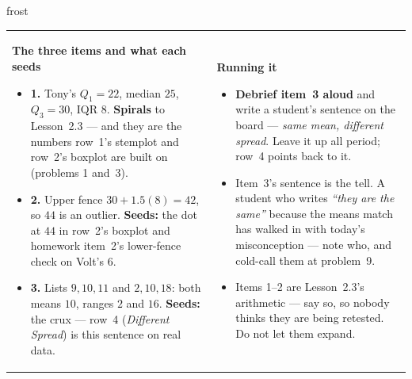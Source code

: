 \documentclass[10pt]{article}
\begin{document}
\begin{fixedskillbox}{frost}
\begin{tabularx}{\linewidth}{@{}X X@{}}
\begin{minipage}[t]{\linewidth}\vspace{0pt}
    \textbf{The three items and what each seeds}
    \begin{itemize}[leftmargin=1.1em, itemsep=1pt, topsep=2pt]
      \item \textbf{1.} Tony's $Q_1 = 22$, median $25$, $Q_3 = 30$, IQR $8$. \textbf{Spirals}
            to Lesson~2.3 --- and they are the numbers row~1's stemplot and row~2's boxplot
            are built on (problems 1 and~3).
      \item \textbf{2.} Upper fence $30 + 1.5(8) = 42$, so $44$ is an outlier. \textbf{Seeds:}
            the dot at $44$ in row~2's boxplot and homework item~2's lower-fence check on
            Volt's $6$.
      \item \textbf{3.} Lists $9, 10, 11$ and $2, 10, 18$: both means $10$, ranges $2$ and
            $16$. \textbf{Seeds:} the crux --- row~4 (\emph{Different Spread}) is this
            sentence on real data.
    \end{itemize}
\end{minipage}
&
\begin{minipage}[t]{\linewidth}\vspace{0pt}
    \textbf{Running it}
    \begin{itemize}[leftmargin=1.1em, itemsep=1pt, topsep=2pt]
      \item \textbf{Debrief item~3 aloud} and write a student's sentence on the board ---
            \emph{same mean, different spread}. Leave it up all period; row~4 points back to
            it.
      \item Item~3's sentence is the tell. A student who writes \emph{``they are the
            same''} because the means match has walked in with today's misconception ---
            note who, and cold-call them at problem~9.
      \item Items 1--2 are Lesson~2.3's arithmetic --- say so, so nobody thinks they are
            being retested. Do not let them expand.
    \end{itemize}
\end{minipage}
\end{tabularx}
\end{fixedskillbox}
\end{document}

